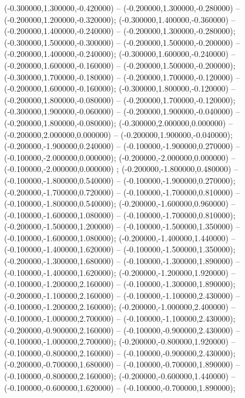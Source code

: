  (-0.300000,1.300000,-0.420000) -- (-0.200000,1.300000,-0.280000) -- (-0.200000,1.200000,-0.320000);
 (-0.300000,1.400000,-0.360000) -- (-0.200000,1.400000,-0.240000) -- (-0.200000,1.300000,-0.280000);
 (-0.300000,1.500000,-0.300000) -- (-0.200000,1.500000,-0.200000) -- (-0.200000,1.400000,-0.240000);
 (-0.300000,1.600000,-0.240000) -- (-0.200000,1.600000,-0.160000) -- (-0.200000,1.500000,-0.200000);
 (-0.300000,1.700000,-0.180000) -- (-0.200000,1.700000,-0.120000) -- (-0.200000,1.600000,-0.160000);
 (-0.300000,1.800000,-0.120000) -- (-0.200000,1.800000,-0.080000) -- (-0.200000,1.700000,-0.120000);
 (-0.300000,1.900000,-0.060000) -- (-0.200000,1.900000,-0.040000) -- (-0.200000,1.800000,-0.080000);
 (-0.300000,2.000000,0.000000) -- (-0.200000,2.000000,0.000000) -- (-0.200000,1.900000,-0.040000);
 (-0.200000,-1.900000,0.240000) -- (-0.100000,-1.900000,0.270000) -- (-0.100000,-2.000000,0.000000);
 (-0.200000,-2.000000,0.000000) -- (-0.100000,-2.000000,0.000000) ;
 (-0.200000,-1.800000,0.480000) -- (-0.100000,-1.800000,0.540000) -- (-0.100000,-1.900000,0.270000);
 (-0.200000,-1.700000,0.720000) -- (-0.100000,-1.700000,0.810000) -- (-0.100000,-1.800000,0.540000);
 (-0.200000,-1.600000,0.960000) -- (-0.100000,-1.600000,1.080000) -- (-0.100000,-1.700000,0.810000);
 (-0.200000,-1.500000,1.200000) -- (-0.100000,-1.500000,1.350000) -- (-0.100000,-1.600000,1.080000);
 (-0.200000,-1.400000,1.440000) -- (-0.100000,-1.400000,1.620000) -- (-0.100000,-1.500000,1.350000);
 (-0.200000,-1.300000,1.680000) -- (-0.100000,-1.300000,1.890000) -- (-0.100000,-1.400000,1.620000);
 (-0.200000,-1.200000,1.920000) -- (-0.100000,-1.200000,2.160000) -- (-0.100000,-1.300000,1.890000);
 (-0.200000,-1.100000,2.160000) -- (-0.100000,-1.100000,2.430000) -- (-0.100000,-1.200000,2.160000);
 (-0.200000,-1.000000,2.400000) -- (-0.100000,-1.000000,2.700000) -- (-0.100000,-1.100000,2.430000);
 (-0.200000,-0.900000,2.160000) -- (-0.100000,-0.900000,2.430000) -- (-0.100000,-1.000000,2.700000);
 (-0.200000,-0.800000,1.920000) -- (-0.100000,-0.800000,2.160000) -- (-0.100000,-0.900000,2.430000);
 (-0.200000,-0.700000,1.680000) -- (-0.100000,-0.700000,1.890000) -- (-0.100000,-0.800000,2.160000);
 (-0.200000,-0.600000,1.440000) -- (-0.100000,-0.600000,1.620000) -- (-0.100000,-0.700000,1.890000);
